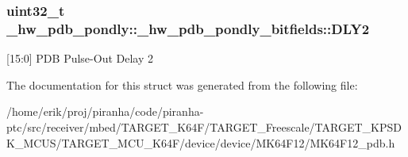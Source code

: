 \subsubsection[{\texorpdfstring{D\+L\+Y2}{DLY2}}]{\setlength{\rightskip}{0pt plus 5cm}uint32\+\_\+t \+\_\+hw\+\_\+pdb\+\_\+pondly\+::\+\_\+hw\+\_\+pdb\+\_\+pondly\+\_\+bitfields\+::\+D\+L\+Y2}\hypertarget{struct__hw__pdb__pondly_1_1__hw__pdb__pondly__bitfields_a38220909a6637d25e4f78e20e28314a4}{}\label{struct__hw__pdb__pondly_1_1__hw__pdb__pondly__bitfields_a38220909a6637d25e4f78e20e28314a4}
\mbox{[}15\+:0\mbox{]} P\+DB Pulse-\/\+Out Delay 2 

The documentation for this struct was generated from the following file\+:\begin{DoxyCompactItemize}
\item 
/home/erik/proj/piranha/code/piranha-\/ptc/src/receiver/mbed/\+T\+A\+R\+G\+E\+T\+\_\+\+K64\+F/\+T\+A\+R\+G\+E\+T\+\_\+\+Freescale/\+T\+A\+R\+G\+E\+T\+\_\+\+K\+P\+S\+D\+K\+\_\+\+M\+C\+U\+S/\+T\+A\+R\+G\+E\+T\+\_\+\+M\+C\+U\+\_\+\+K64\+F/device/device/\+M\+K64\+F12/M\+K64\+F12\+\_\+pdb.\+h\end{DoxyCompactItemize}
